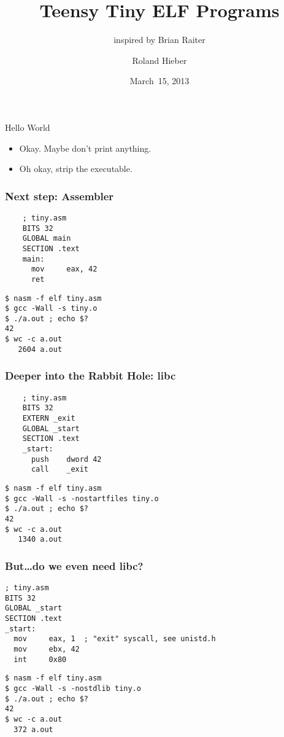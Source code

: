 \documentclass{beamer}
\author{Roland Hieber}
\title{Teensy Tiny ELF Programs}
\subtitle{inspired by Brian Raiter \\}
\institute{Stratum~0~e.\,V.}
\date{March~15, 2013}
\begin{document}
\begin{frame}
	\maketitle
\end{frame}


\begin{frame}{Hello World}

\pause
\begin{itemize}
	\item Okay. Maybe don't print anything.
	\pause
	\item Oh okay, strip the executable.
\end{itemize}
\end{frame}

\begin{frame}[fragile]
\frametitle{Next step: Assembler}
\begin{lstlisting}
	; tiny.asm
	BITS 32
	GLOBAL main
	SECTION .text
	main:
	  mov     eax, 42
	  ret
\end{lstlisting}
\pause
\begin{lstlisting}
$ nasm -f elf tiny.asm
$ gcc -Wall -s tiny.o
$ ./a.out ; echo $?
42
$ wc -c a.out
   2604 a.out
\end{lstlisting}
\end{frame}

\begin{frame}[fragile]
\frametitle{Deeper into the Rabbit Hole: libc}
\begin{lstlisting}
	; tiny.asm
	BITS 32
	EXTERN _exit
	GLOBAL _start
	SECTION .text
	_start:
	  push    dword 42
	  call    _exit
\end{lstlisting}
\pause
\begin{lstlisting}
$ nasm -f elf tiny.asm
$ gcc -Wall -s -nostartfiles tiny.o
$ ./a.out ; echo $?
42
$ wc -c a.out
   1340 a.out
\end{lstlisting}
\end{frame}

\begin{frame}[fragile]
\frametitle{But\ldots do we even need libc?}
\begin{lstlisting}
; tiny.asm
BITS 32
GLOBAL _start
SECTION .text
_start:
  mov     eax, 1  ; "exit" syscall, see unistd.h
  mov     ebx, 42  
  int     0x80
\end{lstlisting}
\pause
\begin{lstlisting}
$ nasm -f elf tiny.asm
$ gcc -Wall -s -nostdlib tiny.o
$ ./a.out ; echo $?
42
$ wc -c a.out
  372 a.out
\end{lstlisting}
\end{frame}
\end{document}
